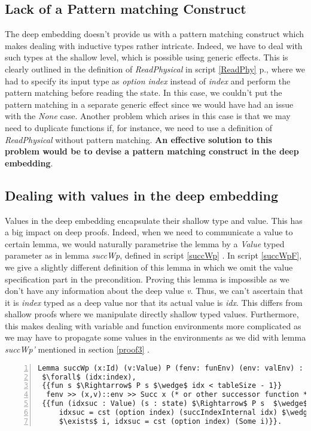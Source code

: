 \subsection{Lack of a Pattern matching Construct}
The deep embedding doesn't provide us with a pattern matching construct which makes dealing with inductive types rather intricate. Indeed, we have to deal with such types at the shallow level, which is possible using generic effects. This is clearly outlined in the definition of \textit{ReadPhysical} in script \ref{ReadPhy} p.\pageref{ReadPhy}, where we had to specify its input type as \textit{option index} instead of \textit{index} and perform the pattern matching before reading the state. In this case, we couldn't put the pattern matching in a separate generic effect since we would have had an issue with the \textit{None} case. Another problem which arises in this case is that we may need to duplicate functions if, for instance, we need to use a definition of \textit{ReadPhysical} without pattern matching. \textbf{An effective solution to this problem would be to devise a pattern matching construct in the deep embedding}. 

\subsection{Dealing with values in the deep embedding}
Values in the deep embedding encapsulate their shallow type and value. This has a big impact on deep proofs. Indeed, when we need to communicate a value to certain lemma, we would naturally parametrise the lemma by a \textit{Value} typed parameter as in lemma \textit{succWp}, defined in script \ref{succWp} \pageref{succWp}. In script \ref{succWpF}, we give a slightly different definition of this lemma in which we omit the value specification part in the precondition. Proving this lemma is impossible as we don't have any information about the deep value \textit{v}. Thus, we can't ascertain that it is \textit{index} typed as a deep value nor that its actual value is \textit{idx}. This differs from shallow proofs where we manipulate directly shallow typed values. Furthermore, this makes dealing with variable and function environments more complicated as we may have to propagate some values in the environments as we did with lemma \textit{succWp'} mentioned in section \ref{proof3} \pageref{proof3}.
\begin{lstlisting}[caption = {succWp false lemma definition},numbers=left, xleftmargin=-.06\textwidth,
xrightmargin=-.06\textwidth, mathescape=true,label={succWpF}]
Lemma succWp (x:Id) (v:Value) P (fenv: funEnv) (env: valEnv) :
 $\forall$ (idx:index), 
 {{fun s $\Rightarrow$ P s $\wedge$ idx < tableSize - 1}} 
  fenv >> (x,v)::env >> Succ x (* or other successor function *) 
 {{fun (idxsuc : Value) (s : state) $\Rightarrow$ P s  $\wedge$
	 idxsuc = cst (option index) (succIndexInternal idx) $\wedge$
	 $\exists$ i, idxsuc = cst (option index) (Some i)}}.
\end{lstlisting} \vspace{4pt}


